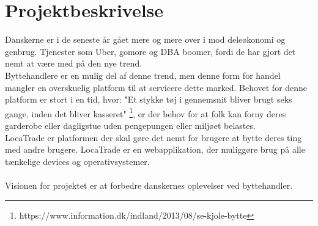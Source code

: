 \chapter{Projektbeskrivelse}\label{ch:Projektbeskrivelse}
Danskerne er i de seneste år gået mere og mere over i mod deleøkonomi og genbrug. Tjenester som Uber, gomore og DBA boomer, fordi de har gjort det nemt at være med på den nye trend. \\Byttehandlere er en mulig del af denne trend, men denne form for handel mangler en overskuelig platform til at servicere dette marked. Behovet for denne platform er stort i en tid, hvor: "Et stykke tøj i gennemsnit bliver brugt seks gange, inden det bliver kasseret" \footnote{https://www.information.dk/indland/2013/08/se-kjole-bytte}, er der behov for at folk kan forny deres garderobe eller dagligstue uden pengepungen eller miljøet belastes. \\
LocaTrade er platformen der skal gøre det nemt for brugere at bytte deres ting med andre brugere. LocaTrade er en webapplikation, der muliggøre brug på alle tænkelige devices og operativsystemer. \\ \\
Visionen for projektet er at forbedre danskernes oplevelser ved byttehandler. 





